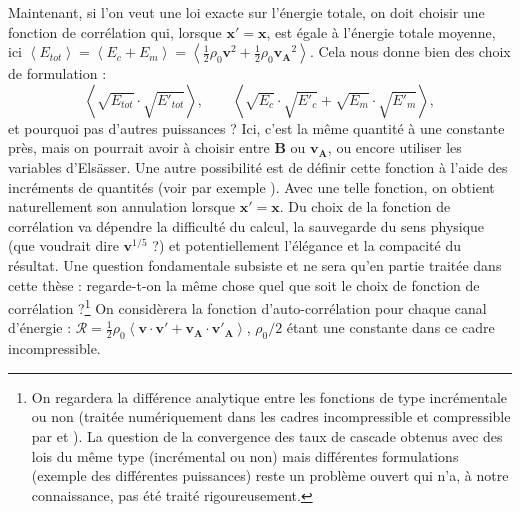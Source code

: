 Maintenant, si l'on veut une loi exacte sur l'énergie totale, on doit choisir une fonction de corrélation qui, lorsque $\boldsymbol{x'}= \boldsymbol{x}$, est égale à l'énergie totale moyenne, ici $\left<E_{tot}\right> = \left<E_c + E_m\right> = \left<\frac{1}{2} \rho_0 \boldsymbol{v}^2 + \frac{1}{2} \rho_0 \boldsymbol{v_A}^2\right>$. Cela nous donne bien des choix de formulation : 
\[\left<\sqrt{E_{tot}} \cdot \sqrt{E'_{tot}}\right>, \qquad \left<\sqrt{E_c} \cdot \sqrt{E'_c} + \sqrt{E_m} \cdot \sqrt{E'_m} \right>,\] et pourquoi pas d'autres puissances ? Ici, c'est la même quantité à une constante près, mais on pourrait avoir à choisir entre $\boldsymbol{B}$ ou $\boldsymbol{v_A}$, ou encore utiliser les variables d'Elsässer. Une autre possibilité est de définir cette fonction à l'aide des incréments de quantités (voir par exemple \cite{antonia_analogy_1997}). Avec une telle fonction, on obtient naturellement son annulation lorsque $\boldsymbol{x'}= \boldsymbol{x}$. Du choix de la fonction de corrélation va dépendre la difficulté du calcul, la sauvegarde du sens physique (que voudrait dire $\boldsymbol{v}^{1/5}$ ?) et potentiellement l'élégance et la compacité du résultat. Une question fondamentale subsiste et ne sera qu'en partie traitée dans cette thèse : regarde-t-on la même chose quel que soit le choix de fonction de corrélation ?\footnote{On regardera la différence analytique entre les fonctions de type incrémentale ou non (traitée numériquement dans les cadres  incompressible et compressible par \cite{ferrand_exact_2019} et \cite{ferrand_-depth_2022}). La question de la convergence des taux de cascade obtenus avec des lois du même type (incrémental ou non) mais différentes formulations (exemple des différentes puissances) reste un problème ouvert qui n'a, à notre connaissance, pas été traité rigoureusement.} On considèrera la fonction d'auto-corrélation pour chaque canal d'énergie : $\mathcal{R} = \frac{1}{2} \rho_0\left< \boldsymbol{v} \cdot \boldsymbol{v'} + \boldsymbol{v_A} \cdot \boldsymbol{v'_A}\right>$, $\rho_0/2$ étant une constante dans ce cadre incompressible. 

